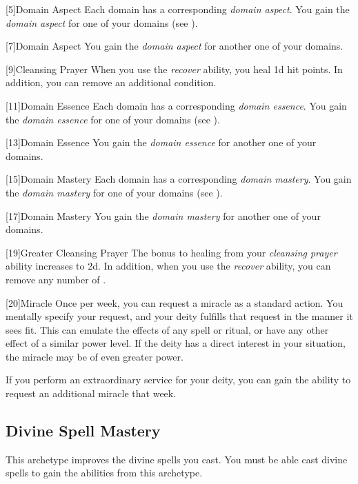         [5]{Domain Aspect}
        Each domain has a corresponding \textit{domain aspect}.
        You gain the \textit{domain aspect} for one of your domains (see ).

        [7]{Domain Aspect} 
        You gain the \textit{domain aspect} for another one of your domains.

        [9]{Cleansing Prayer}
        When you use the \textit{recover} ability, you heal \plus1d hit points.
        In addition, you can remove an additional condition.

        [11]{Domain Essence}
        Each domain has a corresponding \textit{domain essence}.
        You gain the \textit{domain essence} for one of your domains (see ).

        [13]{Domain Essence} 
        You gain the \textit{domain essence} for another one of your domains.

        [15]{Domain Mastery}
        Each domain has a corresponding \textit{domain mastery}.
        You gain the \textit{domain mastery} for one of your domains (see ).

        [17]{Domain Mastery} 
        You gain the \textit{domain mastery} for another one of your domains.

        [19]{Greater Cleansing Prayer} 
        The bonus to healing from your \textit{cleansing prayer} ability increases to \plus2d.
        In addition, when you use the \textit{recover} ability, you can remove any number of .

        [20]{Miracle}
        Once per week, you can request a miracle as a standard action.
        You mentally specify your request, and your deity fulfills that request in the manner it sees fit.
        This can emulate the effects of any spell or ritual, or have any other effect of a similar power level.
        If the deity has a direct interest in your situation, the miracle may be of even greater power.

        If you perform an extraordinary service for your deity, you can gain the ability to request an additional miracle that week.

    \subsection{Divine Spell Mastery}
        This archetype improves the divine spells you cast.
        You must be able cast divine spells to gain the abilities from this archetype.

